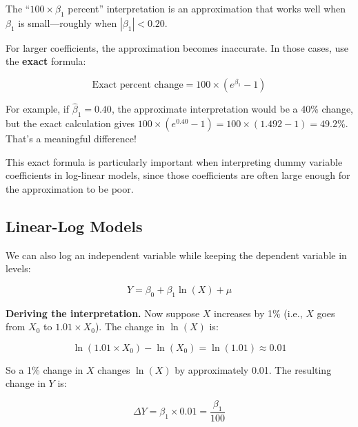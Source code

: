\documentclass[
  letterpaper,
  DIV=11,
  numbers=noendperiod]{scrreprt}
\begin{document}
\begin{tcolorbox}[enhanced jigsaw, arc=.35mm, bottomrule=.15mm, bottomtitle=1mm, breakable, colback=white, colbacktitle=quarto-callout-warning-color!10!white, colframe=quarto-callout-warning-color-frame, coltitle=black, left=2mm, leftrule=.75mm, opacityback=0, opacitybacktitle=0.6, rightrule=.15mm, title=\textcolor{quarto-callout-warning-color}{\faExclamationTriangle}\hspace{0.5em}{When the Approximation Breaks Down}, titlerule=0mm, toprule=.15mm, toptitle=1mm]

The ``\(100 \times \beta_1\) percent'' interpretation is an
approximation that works well when \(\beta_1\) is small---roughly when
\(|\beta_1| < 0.20\).

For larger coefficients, the approximation becomes inaccurate. In those
cases, use the \textbf{exact} formula:

\[
\text{Exact percent change} = 100 \times (e^{\beta_1} - 1)
\]

For example, if \(\hat{\beta}_1 = 0.40\), the approximate interpretation
would be a 40\% change, but the exact calculation gives
\(100 \times (e^{0.40} - 1) = 100 \times (1.492 - 1) = 49.2\%\). That's
a meaningful difference!

This exact formula is particularly important when interpreting dummy
variable coefficients in log-linear models, since those coefficients are
often large enough for the approximation to be poor.

\end{tcolorbox}

\subsection{Linear-Log Models}\label{linear-log-models}

We can also log an independent variable while keeping the dependent
variable in levels:

\[
Y = \beta_0 + \beta_1 \ln(X) + \mu
\]

\textbf{Deriving the interpretation.} Now suppose \(X\) increases by 1\%
(i.e., \(X\) goes from \(X_0\) to \(1.01 \times X_0\)). The change in
\(\ln(X)\) is:

\[
\ln(1.01 \times X_0) - \ln(X_0) = \ln(1.01) \approx 0.01
\]

So a 1\% change in \(X\) changes \(\ln(X)\) by approximately 0.01. The
resulting change in \(Y\) is:

\[
\Delta Y = \beta_1 \times 0.01 = \frac{\beta_1}{100}
\]
\end{document}
